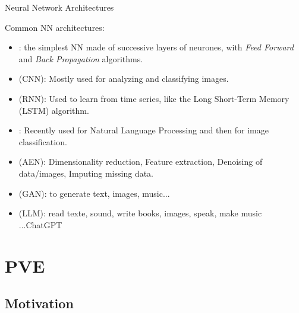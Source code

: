 \documentclass[10pt,serif,mathserif,compress,hyperref={colorlinks}]{beamer}
\begin{document}
\begin{frame}{Neural Network Architectures}

Common NN architectures:
\begin{itemize}
  \item {}: the simplest NN made of successive layers of neurones, with {\em Feed Forward} and {\em Back Propagation} algorithms.
  \item {} (CNN): Mostly used for analyzing and classifying images.
  \item {} (RNN): Used to learn from time series, like the Long Short-Term Memory (LSTM) algorithm.
  \item {} : Recently used for Natural Language Processing and then for image classification.
  \item {} (AEN): Dimensionality reduction, Feature extraction, Denoising of data/images, Imputing missing data.
  \item {} (GAN): to generate text, images, music...
  \item {} (LLM): read texte, sound, write books, images, speak, make music ...ChatGPT
\end{itemize}
{\small\centering[ Graphical chart: \href{https://chart-studio.plotly.com/~SolClover/90.embed?autosize=true&referrer=https\%3A\%2F\%2Ftowardsdatascience.com\%2F}{from Saul Dobilas on Medium}] }
\end{frame}

\section{PVE}

\subsection{Motivation}
\end{document}
